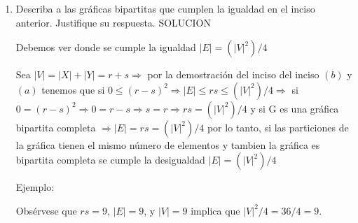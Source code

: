 \documentclass{article}
\begin{document}
\begin{enumerate}
\begin{enumerate}
\begin{proof}
  \end{proof}

  \item Describa a las gr\'aficas bipartitas que cumplen la igualdad en el
    inciso anterior. Justifique su respuesta.
SOLUCION

Debemos ver donde se cumple la igualdad $|E|= (|V|^2)/4$

Sea $|V|= |X| + |Y| = r+s \Longrightarrow$ por la demostración del inciso del inciso $(b)$ y $(a)$ tenemos que si $0\leqslant(r-s)^2 \Longrightarrow |E|\leqslant rs \leqslant (|V|^2)/4 \Longrightarrow$ si $0=(r-s)^2 \Longrightarrow 0=r-s \Longrightarrow s=r \Longrightarrow rs=(|V|^2)/4 $ y si G es una gráfica bipartita completa $\Longrightarrow |E|=rs=(|V|^2)/4$ por lo tanto, si las particiones de la gráfica tienen el mismo número de elementos y tambien la gráfica es bipartita completa se cumple la desigualdad $|E|= (|V|^2)/4$


Ejemplo:
\begin{figure}[ht!]                                                             
  \centering
\end{figure}

Obsérvese que $rs=9$, $|E|=9$, y $|V| = 9$ implica que $|V|^2/4 = 36/4 = 9$.
  \end{enumerate}

\end{enumerate}
\end{document}
